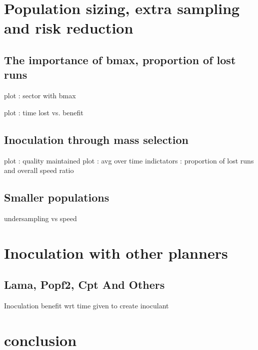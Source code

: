 \documentclass[english]{DESCARWINreport}
\begin{document}
\chapter{Population sizing, extra sampling and risk reduction}

\section{The importance of bmax, proportion of lost runs}

plot : sector with bmax

plot : time lost vs. benefit

\section{Inoculation through mass selection}

plot : quality maintained
plot : avg over time 
indictators : proportion of lost runs and overall speed ratio


\section{Smaller populations}

undersampling vs speed




\chapter{Inoculation with other planners}

\section{Lama, Popf2, Cpt And Others}

Inoculation benefit wrt time given to create inoculant



\chapter{conclusion}
\end{document}
